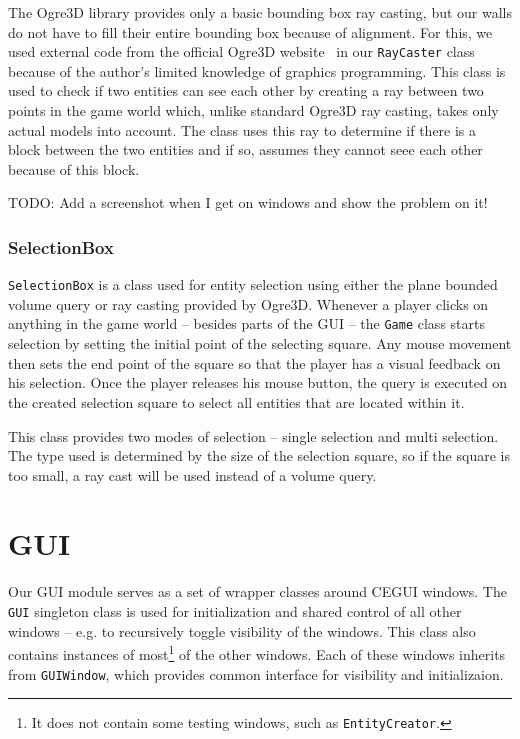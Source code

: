 The Ogre3D library provides only a basic bounding box ray casting, but our walls do not have to fill their entire bounding box because of
alignment. For this, we used external code from the official Ogre3D website~\cite{Ogre3DRaycasting} in our \texttt{RayCaster} class
because of the author's limited knowledge of graphics programming. This class is used to check if two entities can see each other by creating
a ray between two points in the game world which, unlike standard Ogre3D ray casting, takes only actual models into account. The class
uses this ray to determine if there is a block between the two entities and if so, assumes they cannot seee each other because of this
block.

\bigskip
TODO: Add a screenshot when I get on windows and show the problem on it!

\subsubsection{SelectionBox}

\texttt{SelectionBox} is a class used for entity selection using either the plane bounded volume query or ray casting provided by Ogre3D.
Whenever a player
clicks on anything in the game world -- besides parts of the GUI -- the \texttt{Game} class starts selection by setting the initial
point of the selecting square. Any mouse movement then sets the end point of the square so that the player has a visual feedback on his
selection. Once the player releases his mouse button, the query is executed on the created selection square to select all entities that
are located within it.

This class provides two modes of selection -- single selection and multi selection. The type used is determined by the size of the
selection square, so if the square is too small, a ray cast will be used instead of a volume query.

\section{GUI}

Our GUI module serves as a set of wrapper classes around CEGUI windows. The \texttt{GUI} singleton class is used for initialization and
shared control of all other windows -- e.g. to recursively toggle visibility of the windows. This class also contains instances of
most\footnote{It does not contain some testing windows, such as \texttt{EntityCreator}.}
of the other windows. Each of these windows inherits from \texttt{GUIWindow}, which provides common interface for visibility and
initializaion.

